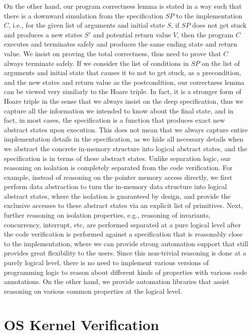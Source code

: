 On the other hand, our program correctness lemma is stated in a way such that there is a downward simulation from the specification $SP$
to the implementation $C$, i.e., for the given list of arguments and initial state $S$, if $SP$ does not get stuck and produces a new 
states $S'$ and potential return value $V$, then the program $C$ executes and terminates safely and produces the same ending state and return value.
We insist on proving the total correctness, thus need to prove that $C$ always terminate safely.
If we consider the list of conditions in $SP$ on the list of arguments and initial state that causes it to not to get stuck, as a precondition,
and the new states and return value as the postcondition, our correctness lemma can be viewed very similarly to the Hoare triple.
In fact, it is a stronger form of Hoare triple in the sense that we always insist on the deep specification, thus we capture all the information
we intended to know about the final state, and in fact, in most cases, the specification is a function that produces exact new abstract states upon 
execution. This does not mean that we always capture entire implementation details in the specification, as we hide all necessary details
when we abstract the concrete in-memory structure into logical abstract states, and the specification is in terms of these abstract states.
Unlike separation logic, our reasoning on isolation is completely separated from the code verification. For example, instead of reasoning
on the pointer memory access directly, we first perform data abstraction to turn the in-memory data structure into logical abstract states,
where the isolation is guaranteed by design, and provide the exclusive accesses to these abstract states via an explicit list of primitives.
Next, further reasoning on isolation properties, e.g., reasoning of invariants, concurrency, interrupt, etc, are performed separated
at a pure logical level after the code verification is performed against a specification that is reasonably close to the implementation,
where we can provide strong automation support that still provides great flexibility to the users.
Since this non-trivial reasoning is done at a purely logical level, there is no need to implement various versions of programming logic
to reason about different kinds of properties with various code annotations.
On the other hand, we provide automation libraries that assist reasoning on various common properties at the logical level. 


\section{OS Kernel Verification}

